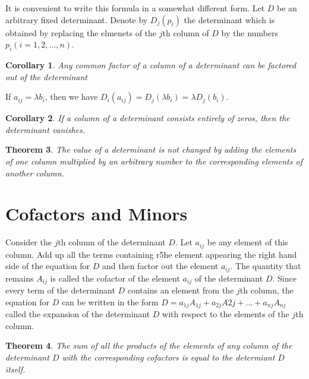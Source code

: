 \documentclass[11pt]{article} %
\newtheorem{theorem}{Theorem}[section]
\newtheorem{corollary}[theorem]{Corollary}
\newenvironment{proof}[1][Proof]{\begin{trivlist}
\item[\hskip \labelsep {\bfseries #1}]}{\end{trivlist}}
\newenvironment{definition}[1][Definition]{\begin{trivlist}
\item[\hskip \labelsep {\bfseries #1}]}{\end{trivlist}}
\begin{document}
\begin{definition}
	It is convenient to write this formula in a somewhat different form. Let $D$ be an arbitrary fixed determinant. Denote by $D_j(p_i)$ the determinant which is obtained by replacing the elmenets of the $j$th column of $D$ by the numbers $p_i (i = 1, 2, \ldots, n)$.
\end{definition}

\begin{corollary}
	Any common factor of a column of a determinant can be factored out of the determinant
\end{corollary}

\begin{proof}
	If $a_{ij} = \lambda b_i$, then we have $D_i(a_{ij}) = D_j(\lambda b_i) = \lambda D_j(b_i). $
\end{proof}

\begin{corollary}
	If a column of a determinant consists entirely of zeros, then the determinant vanishes. 
\end{corollary}

\begin{theorem}
	The value of a determinant is not changed by adding the elements of one column multiplied by an arbitrary number to the corresponding elements of another column. 
\end{theorem}

\section{Cofactors and Minors}

\begin{definition}
	Consider the $j$th column of the determinant $D$. Let $a_{ij}$ be any element of this column. Add up all the terms containing r5he element appearing the right hand side of the equation for $D$ and then factor out the element $a_{ij}$. The quantity that remains $A_{ij}$ is called the cofactor of the element $a_{ij}$ of the determinant $D$. Since every term of the determinant $D$ contains an element from the $j$th column, the equation for $D$ can be written in the form $D = a_{1j}A_{1j} + a_{2j}A{2j} + \ldots + a_{nj}A_{nj}$ called the expansion of the determinant $D$ with respect to the elements of the $j$th column. 
\end{definition}

\begin{theorem}
	The sum of all the products of the elements of any column of the determinant $D$ with the corresponding cofactors is equal to the determiant $D$ itself. 
\end{theorem}
\end{document}
